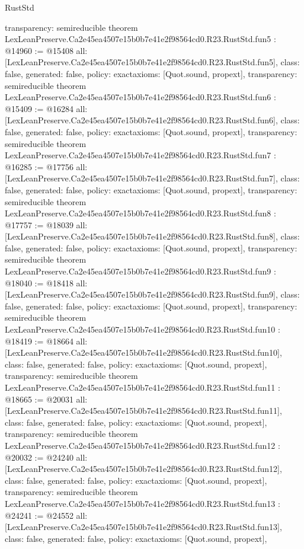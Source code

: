\begin{lexlean}{RustStd}
\begin{coremodule}
{  transparency: semireducible
}
theorem LexLeanPreserve.Ca2e45ea4507e15b0b7e41e2f98564cd0.R23.RustStd.fun5 : @14960 := @15408 {
  all: [LexLeanPreserve.Ca2e45ea4507e15b0b7e41e2f98564cd0.R23.RustStd.fun5],
  class: false,
  generated: false,
  policy: exact{axioms: [Quot.sound, propext]},
  transparency: semireducible
}
theorem LexLeanPreserve.Ca2e45ea4507e15b0b7e41e2f98564cd0.R23.RustStd.fun6 : @15409 := @16284 {
  all: [LexLeanPreserve.Ca2e45ea4507e15b0b7e41e2f98564cd0.R23.RustStd.fun6],
  class: false,
  generated: false,
  policy: exact{axioms: [Quot.sound, propext]},
  transparency: semireducible
}
theorem LexLeanPreserve.Ca2e45ea4507e15b0b7e41e2f98564cd0.R23.RustStd.fun7 : @16285 := @17756 {
  all: [LexLeanPreserve.Ca2e45ea4507e15b0b7e41e2f98564cd0.R23.RustStd.fun7],
  class: false,
  generated: false,
  policy: exact{axioms: [Quot.sound, propext]},
  transparency: semireducible
}
theorem LexLeanPreserve.Ca2e45ea4507e15b0b7e41e2f98564cd0.R23.RustStd.fun8 : @17757 := @18039 {
  all: [LexLeanPreserve.Ca2e45ea4507e15b0b7e41e2f98564cd0.R23.RustStd.fun8],
  class: false,
  generated: false,
  policy: exact{axioms: [Quot.sound, propext]},
  transparency: semireducible
}
theorem LexLeanPreserve.Ca2e45ea4507e15b0b7e41e2f98564cd0.R23.RustStd.fun9 : @18040 := @18418 {
  all: [LexLeanPreserve.Ca2e45ea4507e15b0b7e41e2f98564cd0.R23.RustStd.fun9],
  class: false,
  generated: false,
  policy: exact{axioms: [Quot.sound, propext]},
  transparency: semireducible
}
theorem LexLeanPreserve.Ca2e45ea4507e15b0b7e41e2f98564cd0.R23.RustStd.fun10 : @18419 := @18664 {
  all: [LexLeanPreserve.Ca2e45ea4507e15b0b7e41e2f98564cd0.R23.RustStd.fun10],
  class: false,
  generated: false,
  policy: exact{axioms: [Quot.sound, propext]},
  transparency: semireducible
}
theorem LexLeanPreserve.Ca2e45ea4507e15b0b7e41e2f98564cd0.R23.RustStd.fun11 : @18665 := @20031 {
  all: [LexLeanPreserve.Ca2e45ea4507e15b0b7e41e2f98564cd0.R23.RustStd.fun11],
  class: false,
  generated: false,
  policy: exact{axioms: [Quot.sound, propext]},
  transparency: semireducible
}
theorem LexLeanPreserve.Ca2e45ea4507e15b0b7e41e2f98564cd0.R23.RustStd.fun12 : @20032 := @24240 {
  all: [LexLeanPreserve.Ca2e45ea4507e15b0b7e41e2f98564cd0.R23.RustStd.fun12],
  class: false,
  generated: false,
  policy: exact{axioms: [Quot.sound, propext]},
  transparency: semireducible
}
theorem LexLeanPreserve.Ca2e45ea4507e15b0b7e41e2f98564cd0.R23.RustStd.fun13 : @24241 := @24552 {
  all: [LexLeanPreserve.Ca2e45ea4507e15b0b7e41e2f98564cd0.R23.RustStd.fun13],
  class: false,
  generated: false,
  policy: exact{axioms: [Quot.sound, propext]},
}
\end{coremodule}
\end{lexlean}
